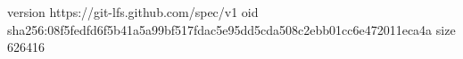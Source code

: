 version https://git-lfs.github.com/spec/v1
oid sha256:08f5fedfd6f5b41a5a99bf517fdac5e95dd5cda508c2ebb01cc6e472011eca4a
size 626416
